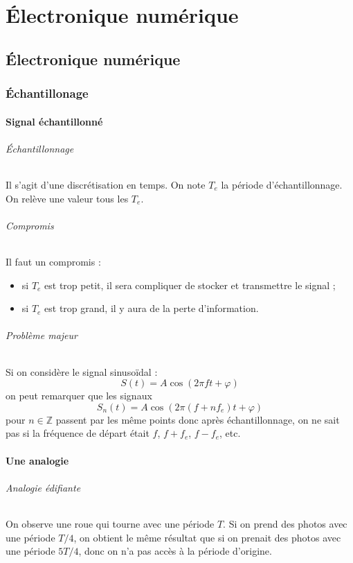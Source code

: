 \documentclass[french]{book}
\theoremstyle{plain}
\theoremstyle{definition}
\theoremstyle{remark}
\newcommand{\Z}{\mathbb{Z}}
\begin{document}
\part{Électronique numérique}
\chapter{Électronique numérique}
\localtableofcontents
\section{Échantillonage}

\subsection{Signal échantillonné}

\paragraph{Échantillonnage} Il s'agit d'une discrétisation en temps. On note $T_e$ la période d'échantillonnage. On relève une valeur tous les $T_e$.

\paragraph{Compromis} Il faut un compromis :
\begin{itemize}
	\item si $T_e$ est trop petit, il sera compliquer de stocker et transmettre le signal ;
	\item si $T_e$ est trop grand, il y aura de la perte d'information.
\end{itemize}

\paragraph{Problème majeur} Si on considère le signal sinusoïdal : $$S(t)=A\cos(2\pi ft+\varphi)$$ on peut remarquer que les signaux $$S_n(t)=A\cos(2\pi(f+nf_e)t+\varphi)$$ pour $n\in\Z$ passent par les même points donc après échantillonnage, on ne sait pas si la fréquence de départ était $f$, $f+f_e$, $f-f_e$, etc.

\subsection{Une analogie}

\paragraph{Analogie édifiante} On observe une roue qui tourne avec une période $T$. Si on prend des photos avec une période $T/4$, on obtient le même résultat que si on prenait des photos avec une période $5T/4$, donc on n'a pas accès à la période d'origine.
\end{document}
